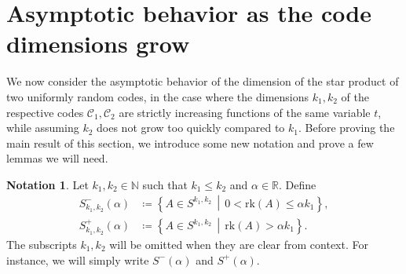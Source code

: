\documentclass[a4paper,11pt,reqno]{article}
\newcommand{\rk}{\mathrm{rk}}
\newcommand{\C}{\mathcal{C}}
\theoremstyle{plain} \numberwithin{equation}{section}
\theoremstyle{definition}
\newtheorem{notation}[theorem]{Notation}
\begin{document}
\section{Asymptotic behavior as the code dimensions grow}
\label{sec:asympindim}

We now consider the asymptotic behavior of the dimension of the star product of two uniformly random codes, in the case where the dimensions $k_1, k_2$ of the respective codes $\C_1, \C_2$ are strictly increasing functions of the same variable $t$, while assuming $k_2$ does not grow too quickly compared to $k_1$. Before proving the main result of this section, we introduce some new notation and prove a few lemmas we will need.

\begin{notation}
Let $k_1,k_2 \in \mathbb{N}$ such that $ k_1\leq k_2$ and $\alpha\in \mathbb{R}$. Define
     \begin{align*}
      S^-_{k_1,k_2}(\alpha) &\coloneqq  \left\{A \in S^{k_1,k_2} \, \middle| \, 0 <  \rk(A) \leq \alpha k_1\right\}, \\
    S_{k_1,k_2}^+(\alpha) &\coloneqq \left\{A \in S^{k_1,k_2} \, \middle| \, \rk(A) > \alpha k_1\right\}.
    \end{align*}
The subscripts $k_1, k_2$ will be omitted when they are clear from context. For instance, we will simply write $S^-(\alpha)$ and $S^+(\alpha)$.
\end{notation}
\end{document}
